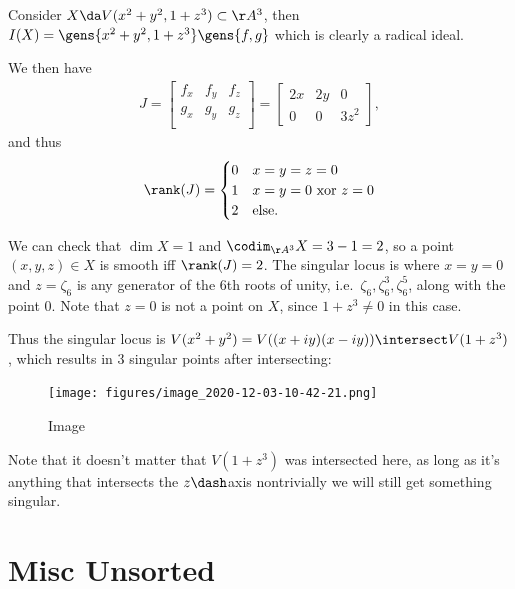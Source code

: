 \begin{example}[?]

Consider \(X\da V(x^2 + y^2, 1+z^3) \subset\AA^3\), then
\(I(X) = \gens{x^2 + y^2, 1 + z^3} \gens{f, g}\) which is clearly a
radical ideal.

We then have
\begin{align*}  
J = 
\begin{bmatrix}
f_x & f_y & f_z \\
g_x & g_y & g_z \\
\end{bmatrix}
=
\begin{bmatrix}
2x & 2y & 0 \\
0 & 0 & 3z^2
\end{bmatrix}
,\end{align*} and thus
\begin{align*}  
\rank(J) = 
\begin{cases}
0 & x=y=z=0 \\
1 & x=y=0 \text{ xor } z=0 \\
2 & \text{else}.
\end{cases}
\end{align*}

We can check that \(\dim X = 1\) and \(\codim_{\AA^3} X = 3-1 = 2\), so
a point \((x,y,z) \in X\) is smooth iff \(\rank(J) = 2\). The singular
locus is where \(x=y=0\) and \(z= \zeta_6\) is any generator of the 6th
roots of unity, i.e.~\(\zeta_6, \zeta_6^3, \zeta_6^5\), along with the
point \(0\). Note that \(z=0\) is not a point on \(X\), since
\(1+z^3\neq 0\) in this case.

Thus the singular locus is
\(V(x^2 + y^2) = V((x+iy)(x-iy)) \intersect V(1+z^3)\), which results in
3 singular points after intersecting:

\begin{figure}
\centering
\texttt{[image: figures/image\_2020-12-03-10-42-21.png]}
\caption{Image}
\end{figure}

Note that it doesn't matter that \(V(1+z^3)\) was intersected here, as
long as it's anything that intersects the \(z\dash\)axis nontrivially we
will still get something singular.

\end{example}

\hypertarget{misc-unsorted}{%
\section{Misc Unsorted}\label{misc-unsorted}}

